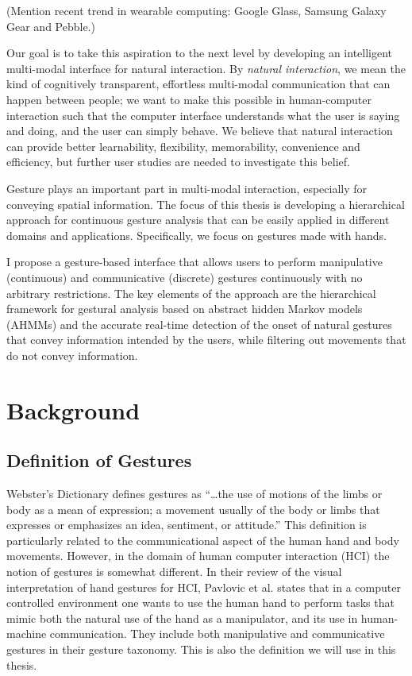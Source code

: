 (Mention recent trend in wearable computing: Google Glass, Samsung Galaxy Gear
and Pebble.) 

Our goal is to take this aspiration to the next level by developing
an intelligent multi-modal interface for natural interaction. By \textit{natural
interaction}, we mean the kind of cognitively transparent, effortless
multi-modal communication that can happen between people; we want to make this possible in
human-computer interaction such that the computer interface understands what the
user is saying and doing, and the user can simply behave. We believe that
natural interaction can provide better learnability, flexibility, memorability,
convenience and efficiency, but further user studies are needed to investigate
this belief.

Gesture plays an important part in multi-modal interaction, especially for
conveying spatial information. The focus of this thesis is developing a
hierarchical approach for continuous gesture analysis that can be easily
applied in different domains and applications. Specifically, we focus on
gestures made with hands. 

I propose a gesture-based interface that allows users to perform
manipulative (continuous) and communicative (discrete) gestures continuously
with no arbitrary restrictions. The key elements of the approach are the hierarchical framework
for gestural analysis based on abstract hidden Markov models (AHMMs) and the
accurate real-time detection of the onset of natural gestures that convey 
information intended by the users, while filtering out movements that do not 
convey information.

\section{Background}
\subsection{Definition of Gestures}
Webster's Dictionary defines gestures as ``\ldots the use of motions of the
limbs or body as a mean of expression; a movement usually of the body or limbs
that expresses or emphasizes an idea, sentiment, or attitude.'' This definition
is particularly related to the communicational aspect of the human hand and body
movements. However, in the domain of human computer interaction (HCI) the notion
of gestures is somewhat different. In their review of the visual interpretation
of hand gestures for HCI, Pavlovic et al. \cite{Pavlovic97} states that in a computer
controlled environment one wants to use the human hand to perform tasks that
mimic both the natural use of the hand as a manipulator, and its use in
human-machine communication. They include both manipulative and communicative
gestures in their gesture taxonomy. This is also the definition we will use in
this thesis.

